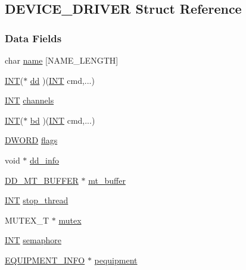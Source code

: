 \subsection{DEVICE\_\-DRIVER Struct Reference}
\label{structDEVICE__DRIVER}
\subsubsection*{Data Fields}
\begin{DoxyCompactItemize}
\item 
char \hyperlink{structDEVICE__DRIVER_a3c47bfe572999fec51df9c6072d6c6d7}{name} \mbox{[}NAME\_\-LENGTH\mbox{]}
\item 
\hyperlink{vppg_8h_a392e62da233ed3e2f7c3fd4f487a3896}{INT}($\ast$ \hyperlink{structDEVICE__DRIVER_adfdb7ee99dd506e35f65d3f8d4b41a4b}{dd} )(\hyperlink{vppg_8h_a392e62da233ed3e2f7c3fd4f487a3896}{INT} cmd,...)
\item 
\hyperlink{vppg_8h_a392e62da233ed3e2f7c3fd4f487a3896}{INT} \hyperlink{structDEVICE__DRIVER_a1451258cb714852eef78ec04e7970f65}{channels}
\item 
\hyperlink{vppg_8h_a392e62da233ed3e2f7c3fd4f487a3896}{INT}($\ast$ \hyperlink{structDEVICE__DRIVER_a885e46846e92facb6222f6a430127772}{bd} )(\hyperlink{vppg_8h_a392e62da233ed3e2f7c3fd4f487a3896}{INT} cmd,...)
\item 
\hyperlink{vt2_8h_a798af1e30bc65f319c1a246cecf59e39}{DWORD} \hyperlink{structDEVICE__DRIVER_ac40f8fcceded9b51b8a772a66f874087}{flags}
\item 
void $\ast$ \hyperlink{structDEVICE__DRIVER_a334e4f80981fd4d70bb6ebea2fe3e911}{dd\_\-info}
\item 
\hyperlink{structDD__MT__BUFFER}{DD\_\-MT\_\-BUFFER} $\ast$ \hyperlink{structDEVICE__DRIVER_a4b3a73f364d8f40376824d1ac2a95eb7}{mt\_\-buffer}
\item 
\hyperlink{vppg_8h_a392e62da233ed3e2f7c3fd4f487a3896}{INT} \hyperlink{structDEVICE__DRIVER_a4dc7498cbf9c5c57a6d1b90aa7a7db6a}{stop\_\-thread}
\item 
MUTEX\_\-T $\ast$ \hyperlink{structDEVICE__DRIVER_a52c55da2a3d4add54467c2d3ded27507}{mutex}
\item 
\hyperlink{vppg_8h_a392e62da233ed3e2f7c3fd4f487a3896}{INT} \hyperlink{structDEVICE__DRIVER_a8233d106afdba2ec9eafefad8cc9a7a0}{semaphore}
\item 
\hyperlink{structEQUIPMENT__INFO}{EQUIPMENT\_\-INFO} $\ast$ \hyperlink{structDEVICE__DRIVER_a0c44eefaa711ea871881308c507c8b00}{pequipment}
\end{DoxyCompactItemize}


